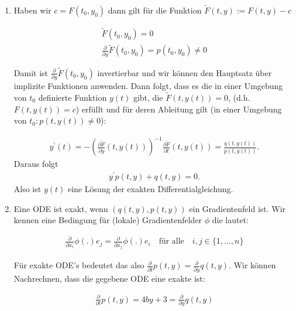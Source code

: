 \begin{solution}
  \phantom{}
\leavevmode \\
\begin{enumerate}[label = \textbf{\alph*)}]
\item
Haben wir $c = F(t_0 , y_0 )$ dann gilt für die Funktion $\widetilde{F}(t,y) := F(t,y) - c$

\begin{align*}
  \widetilde{F}(t_0 , y_0 ) = 0 \\
  \frac{\partial}{\partial y}\widetilde{F}(t_0 , y_0 ) = p(t_0 , y_0 ) \neq 0
\end{align*}

Damit ist $\frac{\partial}{\partial y}\widetilde{F}(t_0 , y_0 )$ invertierbar
und wir können den Hauptsatz über implizite Funktionen anwenden.
Dann folgt, dass es die in einer Umgebung von $t_0$ definierte Funktion $y(t)$ gibt, die
$\widetilde{F}(t,y(t)) = 0$, (d.h. $F(t,y(t))=c$) erfüllt und für
deren Ableitung gilt (in einer Umgebung von $t_0: p(t,y(t)) \neq 0$):

\begin{align*}
  y^{\prime}(t) = -\left(\frac{\partial \widetilde{F}}{\partial y}(t,y(t))\right)^{-1}
  \frac{\partial \widetilde{F}}{\partial t}(t,y(t)) = \frac{q(t,y(t))}{p(t,y(t))}.
\end{align*}
Daraus folgt
\begin{align*}
  y^{\prime}p(t,y) + q(t,y) = 0.
\end{align*}
Also ist $y(t)$ eine Lösung der exakten Differentialgleichung.
\item
Eine ODE ist exakt, wenn $(q(t,y), p(t,y))$ ein Gradientenfeld ist. Wir kennen eine
Bedingung für (lokale) Gradientenfelder $\phi$ die lautet:

\begin{align*}
  \frac{\partial}{\partial x_i} \phi(.) e_j = \frac{\partial}{\partial x_j} \phi(.) e_i
  \quad \text{für alle} \quad i, j \in \{1,...,n\}
\end{align*}

Für exakte ODE's bedeutet  das also $\frac{\partial}{\partial t} p(t,y) =
\frac{\partial}{\partial y} q(t,y)$.
Wir können Nachrechnen, dass die gegebene ODE eine exakte ist:

\begin{align*}
  \frac{\partial}{\partial t} p(t,y) = 4by + 3 =
  \frac{\partial}{\partial y} q(t,y)
\end{align*}


\end{enumerate}
\end{solution}
